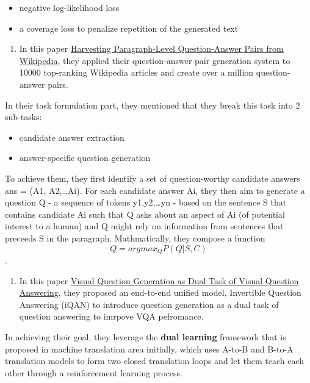 \documentclass[]{book}
\providecommand{\tightlist}{%
  \setlength{\itemsep}{0pt}\setlength{\parskip}{0pt}}
\theoremstyle{definition}
\theoremstyle{definition}
\theoremstyle{definition}
\theoremstyle{remark}
\begin{document}
\begin{itemize}
\tightlist
\item
  negative log-likelihood loss
\item
  a coverage loss to penalize repetition of the generated text
\end{itemize}

\begin{enumerate}
\def\labelenumi{\arabic{enumi}.}
\setcounter{enumi}{1}
\tightlist
\item
  In this paper \href{https://arxiv.org/pdf/1805.05942.pdf}{Harvesting
  Paragraph-Level Question-Answer Pairs from Wikipedia}, they applied
  their question-answer pair generation system to 10000 top-ranking
  Wikipedia articles and create over a million question-answer pairs.
\end{enumerate}

In their task formulation part, they mentioned that they break this task
into 2 sub-tasks:

\begin{itemize}
\tightlist
\item
  candidate answer extraction
\item
  answer-specific question generation
\end{itemize}

To achieve them, they first identify a set of question-worthy candidate
answers ans = (A1, A2,\ldots{}Ai). For each candidate answer Ai, they
then aim to generate a question Q - a sequence of tokens
y1,y2,\ldots{}yn - based on the sentence S that contains candidate Ai
such that Q asks about an aspect of Ai (of potential interest to a
human) and Q might rely on information from sentences that preceeds S in
the paragraph. Mathmatically, they compose a function
\[Q = argmax_Q P(Q|S,C)\].

\begin{enumerate}
\def\labelenumi{\arabic{enumi}.}
\setcounter{enumi}{2}
\tightlist
\item
  In this paper
  \href{http://cvboy.com/pdf/publications/cvpr2018_iqan.pdf}{Visual
  Question Generation as Dual Task of Visual Question Answering}, they
  proposed an end-to-end unified model, Invertible Question Answering
  (iQAN) to introduce question generation as a dual task of question
  answering to imrpove VQA pefromance.
\end{enumerate}

In achieving their goal, they leverage the \textbf{dual learning}
framework that is proposed in machine translation area initially, which
uses A-to-B and B-to-A translation models to form two closed translation
loops and let them teach each other through a reinforcement learning
process.
\end{document}
